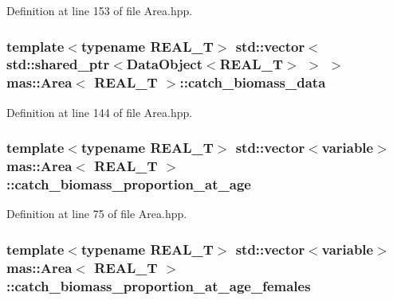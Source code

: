 Definition at line 153 of file Area.\-hpp.

\hypertarget{structmas_1_1_area_ade9dc79427b4c9c46ec5c3ebae967ff0}{
\subsubsection[{catch\-\_\-biomass\-\_\-data}]{\setlength{\rightskip}{0pt plus 5cm}template$<$typename R\-E\-A\-L\-\_\-\-T$>$ std\-::vector$<$std\-::shared\-\_\-ptr$<${\bf Data\-Object}$<$R\-E\-A\-L\-\_\-\-T$>$ $>$ $>$ {\bf mas\-::\-Area}$<$ R\-E\-A\-L\-\_\-\-T $>$\-::catch\-\_\-biomass\-\_\-data}}\label{structmas_1_1_area_ade9dc79427b4c9c46ec5c3ebae967ff0}


Definition at line 144 of file Area.\-hpp.

\hypertarget{structmas_1_1_area_acf32183c88a8bb1979036c7e34340c58}{
\subsubsection[{catch\-\_\-biomass\-\_\-proportion\-\_\-at\-\_\-age}]{\setlength{\rightskip}{0pt plus 5cm}template$<$typename R\-E\-A\-L\-\_\-\-T$>$ std\-::vector$<${\bf variable}$>$ {\bf mas\-::\-Area}$<$ R\-E\-A\-L\-\_\-\-T $>$\-::catch\-\_\-biomass\-\_\-proportion\-\_\-at\-\_\-age}}\label{structmas_1_1_area_acf32183c88a8bb1979036c7e34340c58}


Definition at line 75 of file Area.\-hpp.

\hypertarget{structmas_1_1_area_ab3e0fc299986b3ce569d3da2c750fb05}{
\subsubsection[{catch\-\_\-biomass\-\_\-proportion\-\_\-at\-\_\-age\-\_\-females}]{\setlength{\rightskip}{0pt plus 5cm}template$<$typename R\-E\-A\-L\-\_\-\-T$>$ std\-::vector$<${\bf variable}$>$ {\bf mas\-::\-Area}$<$ R\-E\-A\-L\-\_\-\-T $>$\-::catch\-\_\-biomass\-\_\-proportion\-\_\-at\-\_\-age\-\_\-females}}\label{structmas_1_1_area_ab3e0fc299986b3ce569d3da2c750fb05}


